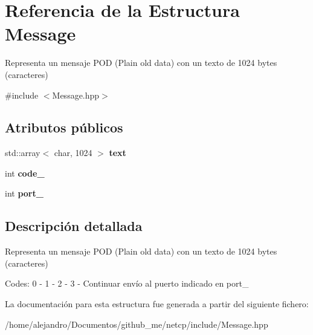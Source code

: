 \hypertarget{structMessage}{}\section{Referencia de la Estructura Message}
\label{structMessage}


Representa un mensaje P\+OD (Plain old data) con un texto de 1024 bytes (caracteres)  




{\ttfamily \#include $<$Message.\+hpp$>$}

\subsection*{Atributos públicos}
\begin{DoxyCompactItemize}
\item 
\mbox{\label{structMessage_a8398aec0171dec03c496704e79fd0022}} 
std\+::array$<$ char, 1024 $>$ {\bfseries text}
\item 
\mbox{\label{structMessage_aaeff602e34763cb97a9fe25d435f7164}} 
int {\bfseries code\+\_\+}
\item 
\mbox{\label{structMessage_af6c004d9113d8d6590cc717ebe4a8c48}} 
int {\bfseries port\+\_\+}
\end{DoxyCompactItemize}


\subsection{Descripción detallada}
Representa un mensaje P\+OD (Plain old data) con un texto de 1024 bytes (caracteres) 

Codes\+: 0 -\/ 1 -\/ 2 -\/ 3 -\/ Continuar envío al puerto indicado en port\+\_\+ 

La documentación para esta estructura fue generada a partir del siguiente fichero\+:\begin{DoxyCompactItemize}
\item 
/home/alejandro/\+Documentos/github\+\_\+me/netcp/include/Message.\+hpp\end{DoxyCompactItemize}
